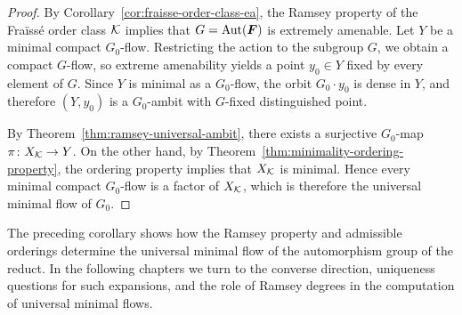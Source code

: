 \begin{proof}
    By Corollary~\ref{cor:fraisse-order-class-ea}, the Ramsey property of the Fraïssé order class \(\mathcal{K}\) implies that
    \(G=\operatorname{Aut}(\boldsymbol{F})\)
    is extremely amenable. Let \(Y\) be a minimal compact \(G_0\)-flow. Restricting the action to the subgroup \(G\), we obtain a compact \(G\)-flow, so extreme amenability yields a point
    \(y_0\in Y\)
    fixed by every element of \(G\). Since \(Y\) is minimal as a \(G_0\)-flow, the orbit
    \(G_0\cdot y_0\)
    is dense in \(Y\), and therefore \((Y,y_0)\) is a \(G_0\)-ambit with \(G\)-fixed distinguished point.

    By Theorem~\ref{thm:ramsey-universal-ambit}, there exists a surjective
    \(G_0\)-map \(\pi\colon X_{\mathcal{K}}\to Y\).
    On the other hand, by Theorem~\ref{thm:minimality-ordering-property}, the ordering property implies that \(X_{\mathcal{K}}\) is minimal. Hence every minimal compact \(G_0\)-flow is a factor of \(X_{\mathcal{K}}\), which is therefore the universal minimal flow of \(G_0\).
\end{proof}

The preceding corollary shows how the Ramsey property and admissible orderings determine the universal minimal flow of the automorphism group of the reduct. In the following chapters we turn to the converse direction, uniqueness questions for such expansions, and the role of Ramsey degrees in the computation of universal minimal flows.
